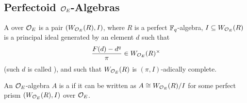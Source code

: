 \documentclass[a4paper, 10pt, oneside, DIV=9, chapterprefix=true, numbers=enddot,bibliography=totoc]{scrbook}
\begin{document}
\subsection{Perfectoid \texorpdfstring{$\mathcal{O}_E$}{O}-Algebras}
\begin{defi}
	\begin{numerate}
		\item A  over $\mathcal{O}_E$ is a pair $(W_{\mathcal{O}_E}(R),I)$, where $R$ is a perfect $\mathbb{F}_q$-algebra, $I\subseteq W_{\mathcal{O}_E}(R)$ is a principal ideal generated by an element $d$ such that
		\begin{equation*}
			\frac{F(d)-d^q}{\pi}\in W_{\mathcal{O}_E}(R)^\times
		\end{equation*}
		(such $d$ is called ), and such that $W_{\mathcal{O}_E}(R)$ is $(\pi,I)$-adically complete.
		\item An $\mathcal{O}_E$-algebra $A$ is a  if it can be written as $A\cong W_{\mathcal{O}_E}(R)/I$ for some perfect prism $(W_{\mathcal{O}_E}(R),I)$ over $\mathcal{O}_E$.
	\end{numerate}
\end{defi}
\end{document}
